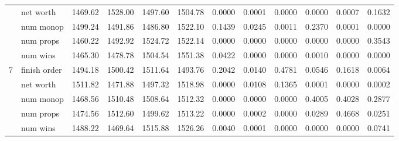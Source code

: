 \begin{landscape}
\begin{table}[ht]
\begin{tabularx}{\linewidth}{|p{1in}|p{1in}|r|r|r|r|r|r|r|r|r|r|}
\cline{2-12}      & net worth & 1469.62 & \cellcolor{green!55!white}1528.00 & 1497.60 & \cellcolor{green!55!white}1504.78 & 0.0000 & 0.0001 & 0.0000 & 0.0000 & 0.0007 & \cellcolor{red!55!white}0.1632 \\
\cline{2-12}      & num monop & 1499.24 & 1491.86 & 1486.80 & \cellcolor{green!55!white}1522.10 & \cellcolor{red!55!white}0.1439 & \cellcolor{red!55!white}0.0245 & 0.0011 & \cellcolor{red!55!white}0.2370 & 0.0001 & 0.0000 \\
\cline{2-12}      & num props & 1460.22 & 1492.92 & \cellcolor{green!55!white}1524.72 & \cellcolor{green!55!white}1522.14 & 0.0000 & 0.0000 & 0.0000 & 0.0000 & 0.0000 & \cellcolor{red!55!white}0.3543 \\
\cline{2-12}      & num wins & 1465.30 & 1478.78 & \cellcolor{green!55!white}1504.54 & \cellcolor{green!55!white}1551.38 & \cellcolor{red!55!white}0.0422 & 0.0000 & 0.0000 & 0.0010 & 0.0000 & 0.0000 \\
      \cline{1-12}
      \multirow{5}{*}{7} & finish order & 1494.18 & \cellcolor{green!55!white}1500.42 & \cellcolor{green!55!white}1511.64 & 1493.76 & \cellcolor{red!55!white}0.2042 & \cellcolor{red!55!white}0.0140 & \cellcolor{red!55!white}0.4781 & \cellcolor{red!55!white}0.0546 & \cellcolor{red!55!white}0.1618 & 0.0064 \\
\cline{2-12}      & net worth & \cellcolor{green!55!white}1511.82 & 1471.88 & 1497.32 & \cellcolor{green!55!white}1518.98 & 0.0000 & \cellcolor{red!55!white}0.0108 & \cellcolor{red!55!white}0.1365 & 0.0001 & 0.0000 & 0.0002 \\
\cline{2-12}      & num monop & 1468.56 & \cellcolor{green!55!white}1510.48 & \cellcolor{green!55!white}1508.64 & \cellcolor{green!55!white}1512.32 & 0.0000 & 0.0000 & 0.0000 & \cellcolor{red!55!white}0.4005 & \cellcolor{red!55!white}0.4028 & \cellcolor{red!55!white}0.2877 \\
\cline{2-12}      & num props & 1474.56 & \cellcolor{green!55!white}1512.60 & 1499.62 & \cellcolor{green!55!white}1513.22 & 0.0000 & 0.0002 & 0.0000 & \cellcolor{red!55!white}0.0289 & \cellcolor{red!55!white}0.4668 & \cellcolor{red!55!white}0.0251 \\
\cline{2-12}      & num wins & 1488.22 & 1469.64 & \cellcolor{green!55!white}1515.88 & \cellcolor{green!55!white}1526.26 & 0.0040 & 0.0001 & 0.0000 & 0.0000 & 0.0000 & \cellcolor{red!55!white}0.0741 \\
      \cline{1-12}

    \end{tabularx}%
  \label{tab:intrapop128_finorder}%
\end{table}%


\end{landscape}
